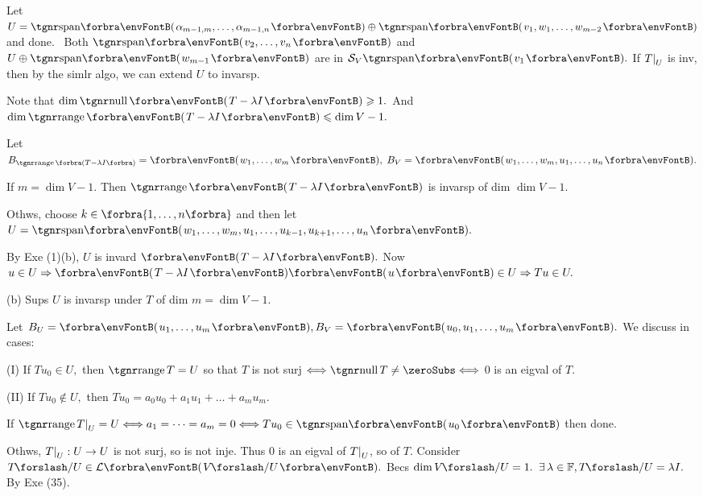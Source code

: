 Let $U=\Span{\alpha_{m-1,m},\dots,\alpha_{m-1,n}}\oplus\Span{v_1,w_1,\dots,w_{m-2}}$ and done.\PfEnd\quad\Ha
\Comment \,\,\,Both $\Span{v_2,\dots,v_n}$ and $U\oplus\Span{w_{m-1}}$ are in $\mathcal{S}_V \Span{v_1}.$\parCom\quad\Ha
{\tgsl If $T\text{\normalsize|}_U$ is inv, then by the simlr algo, we can extend $U$ to invarsp.}\par\vspace{6pt}\quad\Ha
\Or Note that $\dim\null\Par{T-\lambda I}\geqslant 1.$ And $\dim\range\Par{T-\lambda I}\leqslant\dim V-1.$\par\quad\Ha
Let $B_{\range\SmallPar{T-\lambda I}}=\Par{w_1,\dots,w_m},\;B_V=\Par{w_1,\dots,w_m,u_1,\dots,u_n}.$\par\quad\Ha
If $m=\dim V-1.$  Then $\range\Par{T-\lambda I}$ is invarsp of dim $\dim V-1.$\par\quad\Ha
Othws, choose $k\in\Bra{1,\dots,n}$ and then let $U=\Span{w_1,\dots,w_m,u_1,\dots,u_{k-1},u_{k+1},\dots,u_n}.$\par\quad\Ha
By Exe (1)(b), $U$ is invard $\Par{T-\lambda I}.$ Now $u\in U\Rightarrow \Par{T-\lambda I}\Par{u}\in U\Rightarrow Tu\in U.$\par\vspace{6pt}\quad
(b) Sups $U$ is invarsp under $T$ of dim $m=\dim V-1.$ \par\quad\Hb
Let $B_U=\Par{u_1,\dots,u_m},B_V=\Par{u_0,u_1,\dots,u_m}.$ We discuss in cases:\par\quad\Hb
(I) If $Tu_0\in U,$ then $\range T=U$ so that $T$ is not surj $\Longleftrightarrow \null T\neq\zeroSubs\Longleftrightarrow$ $0$ is an eigval of $T.$\par\quad\Hb\EndI
(II) If $Tu_0\not\in U,$ then $Tu_0=a_0 u_0+a_1 u_1+\dots+a_mu_m.$\par\quad\Hb\EndII
If $\range T\mmid_U=U\Longleftrightarrow a_1=\dots=a_m=0\Longleftrightarrow Tu_0\in\Span{u_0}$ then done.\par\quad\Hb\EndII
Othws, $T\text{\normalsize|}_U:U\rightarrow U$ is not surj, so is not inje. Thus $0$ is an eigval of $T\text{\normalsize|}_U$, so of $T.$\PfEnd\vspace{4pt}\quad\Hb
\Or Consider $T\XSlash U\in\Lm{V\XSlash U}.$ Becs $\dim V\XSlash U=1.$ $\exists\,\lambda\in\Fbb,T\XSlash U=\lambda I.$ By Exe (35).\PfEnd
\SepLine
\ChEnd\pagebreak

\large\vspace{5pt}

